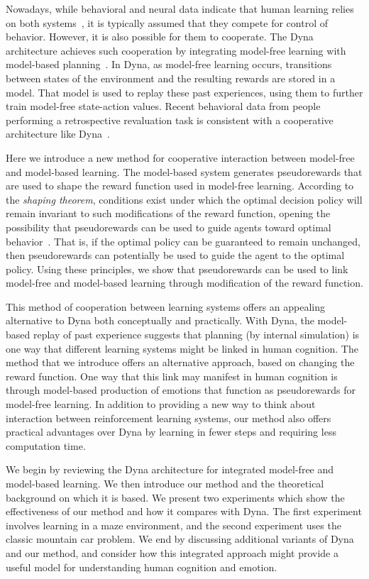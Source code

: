 \documentclass[letterpaper]{article}
\begin{document}
Nowadays, while behavioral and neural data indicate that human learning relies on both systems~\cite{daw2005uncertainty, glascher2010states, dayan2014model}, it is typically assumed that they compete for control of behavior. However, it is also possible for them to cooperate. The Dyna architecture achieves such cooperation by integrating model-free learning with model-based planning~\cite{sutton1991dyna}. In Dyna, as model-free learning occurs, transitions between states of the environment and the resulting rewards are stored in a model. That model is used to replay these past experiences, using them to further train model-free state-action values. Recent behavioral data from people performing a retrospective revaluation task is consistent with a cooperative architecture like Dyna~\cite{gershman2014retrospective}.

Here we introduce a new method for cooperative interaction between model-free and model-based learning. The model-based system generates pseudorewards that are used to shape the reward function used in model-free learning. According to the \textit{shaping theorem}, conditions exist under which the optimal decision policy will remain invariant to such modifications of the reward function, opening the possibility that pseudorewards can be used to guide agents toward optimal behavior~\cite{ng1999policy}. That is, if the optimal policy can be guaranteed to remain unchanged, then pseudorewards can potentially be used to guide the agent to the optimal policy. Using these principles, we show that pseudorewards can be used to link model-free and model-based learning through modification of the reward function.

This method of cooperation between learning systems offers an appealing alternative to Dyna both conceptually and practically. With Dyna, the model-based replay of past experience suggests that planning (by internal simulation) is one way that different learning systems might be linked in human cognition. The method that we introduce offers an alternative approach, based on changing the reward function. One way that this link may manifest in human cognition is through model-based production of emotions that function as pseudorewards for model-free learning. In addition to providing a new way to think about interaction between reinforcement learning systems, our method also offers practical advantages over Dyna by learning in fewer steps and requiring less computation time.

We begin by reviewing the Dyna architecture for integrated model-free and model-based learning. We then introduce our method and the theoretical background on which it is based. We present two experiments which show the effectiveness of our method and how it compares with Dyna. The first experiment involves learning in a maze environment, and the second experiment uses the classic mountain car problem. We end by discussing additional variants of Dyna and our method, and consider how this integrated approach might provide a useful model for understanding human cognition and emotion.
\end{document}
